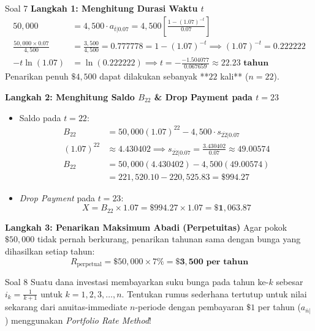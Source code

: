\documentclass[11pt,a4paper]{article}
\begin{document}
\begin{solutionbox}{Soal 7}
\textbf{Langkah 1: Menghitung Durasi Waktu $t$}
\begin{align*}
    50{,}000 &= 4{,}500 \cdot a_{\overline{t}|0.07} = 4{,}500 \left[\frac{1 - (1.07)^{-t}}{0.07}\right] \\[0.4em]
    \frac{50{,}000 \times 0.07}{4{,}500} &= \frac{3{,}500}{4{,}500} = 0.777778 = 1 - (1.07)^{-t} \implies (1.07)^{-t} = 0.222222 \\[0.4em]
    -t \ln(1.07) &= \ln(0.222222) \implies t = -\frac{-1.504077}{0.067659} \approx \mathbf{22.23 \text{ tahun}}
\end{align*}
Penarikan penuh $\$4{,}500$ dapat dilakukan sebanyak **$22$ kali** ($n = 22$).

\textbf{Langkah 2: Menghitung Saldo $B_{22}$ \& Drop Payment pada $t = 23$}
\begin{itemize}
    \item Saldo pada $t = 22$:
    \begin{align*}
        B_{22} &= 50{,}000(1.07)^{22} - 4{,}500 \cdot s_{\overline{22}|0.07} \\[0.3em]
        (1.07)^{22} &\approx 4.430402 \implies s_{\overline{22}|0.07} = \frac{3.430402}{0.07} \approx 49.00574 \\[0.3em]
        B_{22} &= 50{,}000(4.430402) - 4{,}500(49.00574) \\
               &= 221{,}520.10 - 220{,}525.83 = \mathbf{\$994.27}
    \end{align*}
    \item \textit{Drop Payment} pada $t = 23$:
    \begin{equation*}
        X = B_{22} \times 1.07 = \$994.27 \times 1.07 = \mathbf{\$1{,}063.87}
    \end{equation*}
\end{itemize}

\textbf{Langkah 3: Penarikan Maksimum Abadi (Perpetuitas)}
Agar pokok $\$50{,}000$ tidak pernah berkurang, penarikan tahunan sama dengan bunga yang dihasilkan setiap tahun:
\begin{equation*}
    R_{\text{perpetual}} = \$50{,}000 \times 7\% = \mathbf{\$3{,}500 \text{ per tahun}}
\end{equation*}
\end{solutionbox}

\vspace{1.5em}

\begin{problembox}{Soal 8}
Suatu dana investasi membayarkan suku bunga pada tahun ke-$k$ sebesar $i_k = \frac{1}{k+1}$ untuk $k = 1, 2, 3, \dots, n$.
Tentukan rumus sederhana tertutup untuk nilai sekarang dari anuitas-immediate $n$-periode dengan pembayaran $\$1$ per tahun ($a_{\overline{n}|}$) menggunakan \textit{Portfolio Rate Method}!
\end{problembox}
\end{document}
